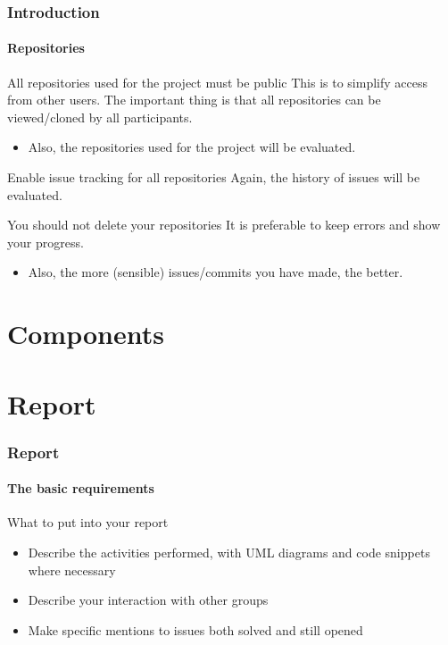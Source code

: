 \begin{frame}
\frametitle{Introduction}
\framesubtitle{Repositories}

\begin{block}{All repositories used for the project must be public}
This is to simplify access from other users. The important thing is that all repositories can be viewed/cloned by all participants.
\begin{itemize}
\item Also, the repositories used for the project will be evaluated.
\end{itemize}
\end{block}
\pause
\begin{block}{Enable issue tracking for all repositories}
Again, the history of issues will be evaluated.
\end{block}
\pause
\begin{block}{You should not delete your repositories}
It is preferable to keep errors and show your progress.
\begin{itemize}
\item Also, the more (sensible) issues/commits you have made, the better.
\end{itemize}
\end{block}
\end{frame}

\section{Components}



\section{Report}

\begin{frame}
\frametitle{Report}
\framesubtitle{The basic requirements}

\begin{block}{What to put into your report}
\begin{itemize}
\item Describe the activities performed, with UML diagrams and code snippets where necessary
\item Describe your interaction with other groups
\item Make specific mentions to issues both solved and still opened
\end{itemize}
\end{block}
\end{frame}

